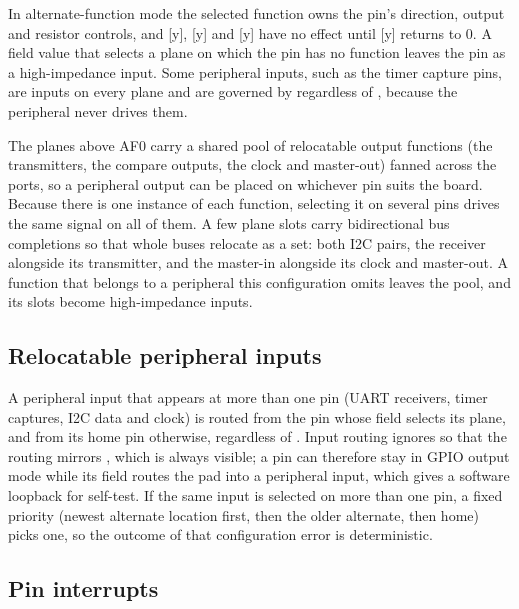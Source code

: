 In alternate-function mode the selected function owns the pin's direction, output and resistor controls, and [y], [y] and [y] have no effect until [y] returns to 0. A field value that selects a plane on which the pin has no function leaves the pin as a high-impedance input. Some peripheral inputs, such as the timer capture pins, are inputs on every plane and are governed by  regardless of , because the peripheral never drives them.

The planes above AF0 carry a shared pool of relocatable output functions (the  transmitters, the  compare outputs, the  clock and master-out) fanned across the ports, so a peripheral output can be placed on whichever pin suits the board. Because there is one instance of each function, selecting it on several pins drives the same signal on all of them. A few plane slots carry bidirectional bus completions so that whole buses relocate as a set: both I2C pairs, the  receiver alongside its transmitter, and the  master-in alongside its clock and master-out. A function that belongs to a peripheral this configuration omits leaves the pool, and its slots become high-impedance inputs.

\subsection{Relocatable peripheral inputs}

A peripheral input that appears at more than one pin (UART receivers, timer captures, I2C data and clock) is routed from the pin whose  field selects its plane, and from its home pin otherwise, regardless of . Input routing ignores  so that the routing mirrors , which is always visible; a pin can therefore stay in GPIO output mode while its  field routes the pad into a peripheral input, which gives a software loopback for self-test. If the same input is selected on more than one pin, a fixed priority (newest alternate location first, then the older alternate, then home) picks one, so the outcome of that configuration error is deterministic.

\subsection{Pin interrupts}

